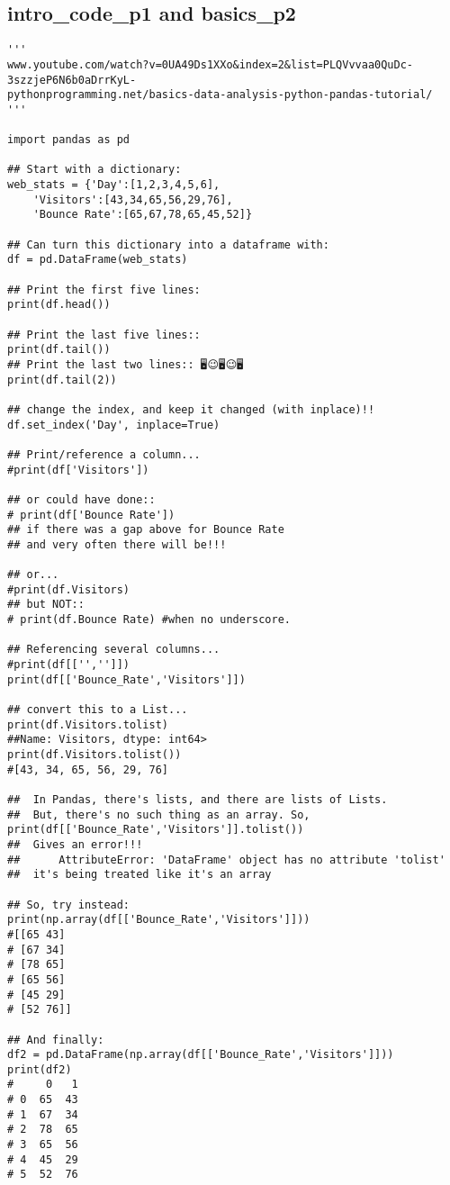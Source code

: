 \documentclass[11pt,a4paper]{article}
\begin{document}
\subsection{intro\_code\_p1 and basics\_p2}
\smallskip
\smallskip
\noindent 
\begin{lstlisting}
'''
www.youtube.com/watch?v=0UA49Ds1XXo&index=2&list=PLQVvvaa0QuDc-3szzjeP6N6b0aDrrKyL-
pythonprogramming.net/basics-data-analysis-python-pandas-tutorial/
'''

import pandas as pd

## Start with a dictionary: 
web_stats = {'Day':[1,2,3,4,5,6],
    'Visitors':[43,34,65,56,29,76],
    'Bounce Rate':[65,67,78,65,45,52]}

## Can turn this dictionary into a dataframe with:
df = pd.DataFrame(web_stats)

## Print the first five lines:
print(df.head())

## Print the last five lines::
print(df.tail())
## Print the last two lines:: 🖥😉🖥️️😉🖥️
print(df.tail(2))

## change the index, and keep it changed (with inplace)!! 
df.set_index('Day', inplace=True)

## Print/reference a column... 
#print(df['Visitors'])

## or could have done::
# print(df['Bounce Rate'])
## if there was a gap above for Bounce Rate 
## and very often there will be!!!

## or...
#print(df.Visitors)
## but NOT::
# print(df.Bounce Rate) #when no underscore.

## Referencing several columns...
#print(df[['','']])
print(df[['Bounce_Rate','Visitors']])

## convert this to a List...
print(df.Visitors.tolist)
##Name: Visitors, dtype: int64>
print(df.Visitors.tolist())
#[43, 34, 65, 56, 29, 76]

##  In Pandas, there's lists, and there are lists of Lists.
##  But, there's no such thing as an array. So, 
print(df[['Bounce_Rate','Visitors']].tolist())
##  Gives an error!!!
##      AttributeError: 'DataFrame' object has no attribute 'tolist'
##  it's being treated like it's an array

## So, try instead:
print(np.array(df[['Bounce_Rate','Visitors']]))
#[[65 43]
# [67 34]
# [78 65]
# [65 56]
# [45 29]
# [52 76]]

## And finally:
df2 = pd.DataFrame(np.array(df[['Bounce_Rate','Visitors']]))
print(df2)
#     0   1
# 0  65  43
# 1  67  34
# 2  78  65
# 3  65  56
# 4  45  29
# 5  52  76
\end{lstlisting}
\clearpage
\end{document}
